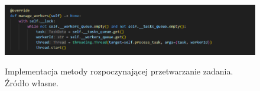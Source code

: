 \begin{figure}[!ht]
	\begin{center}
		\resizebox{1\textwidth}{!} {
			\includegraphics{img/3/orkiestrator-kontenerow-manage-workers.png}
		}
		\caption{Implementacja metody rozpoczynającej przetwarzanie zadania. Źródło własne.}
		\label{fig:scheduler-manage-workers-impl}
	\end{center}
\end{figure}